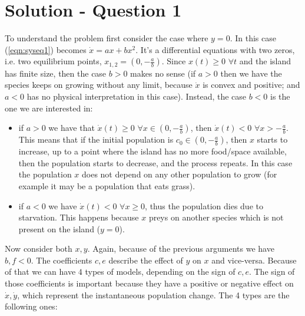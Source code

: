 \section*{Solution - Question 1}

To understand the problem first consider the case where $y=0$. In this case (\ref{eqn:syseq1}) becomes $\dot{x} = ax+bx^2$. It's a differential equations with two zeros, i.e. two equilibrium points, $x_{1,2} = (0, -\frac{a}{b})$. Since $x(t) \geq 0 $ $\forall t$ and the island has finite size, then the case $b>0$ makes no sense (if $a>0$ then we have the species keeps on growing without any limit, because $\dot{x}$ is convex and positive; and $a<0$ has no physical interpretation in this case).
Instead, the case $b<0$ is the one we are interested in:
\begin{itemize}
\item if $a > 0$ we have that $\dot{x}(t) \geq 0 $ $\forall x \in (0, -\frac{a}{b})$, then $\dot{x}(t) < 0 $  $\forall x > -\frac{a}{b}$. This means that if the initial population is $c_0 \in (0, -\frac{a}{b})$, then $x$  starts to increase, up to a point where the island has no more food/space available, then the population starts to decrease, and the process repeats. In this case the population $x$ does not depend on any other population to grow (for example it may be a population that eats grass).
\item if $a < 0$ we have $\dot{x}(t) < 0$ $\forall x\geq 0$, thus the population dies due to starvation. This happens because $x$ preys on another species which is not present on the island ($y=0$). 
\end{itemize}
Now consider both $x,y$. Again, because of the previous arguments we have $b,f < 0$. The coefficients $c,e$ describe the effect of $y$ on $x$ and vice-versa.  Because of that we can have $4$ types of models, depending on the sign of $c,e$. The sign of those coefficients is important because they have a positive or negative effect on $\dot{x},\dot{y}$, which represent the instantaneous population change. The 4 types are the following ones:
